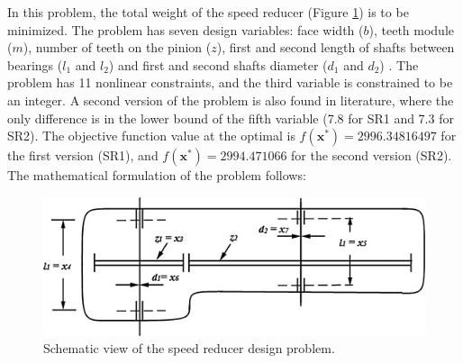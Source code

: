 

In this problem, the total weight of the speed reducer (Figure \ref{fig:SR}) is to be minimized. The problem has seven design variables: face width ($b$), teeth module ($m$), number of teeth on the pinion ($z$), first and second length of shafts between bearings ($l_1$ and $l_2$) and first and second shafts diameter ($d_1$ and $d_2$) \citep{SR}. The problem has 11 nonlinear constraints, and the third variable is constrained to be an integer. A second version of the problem is also found in literature, where the only difference is in the lower bound of the fifth variable (7.8 for SR1 and 7.3 for SR2). The objective function value at the optimal is $f(\bm{x}^*) = 2996.34816497$ for the first version (SR1), and $f(\bm{x}^*) = 2994.471066$ for the second version (SR2). The mathematical formulation of the problem follows:

\vspace{-0.5cm}



\vspace{0.5cm}

\begin{figure}[h]
    \begin{center}
    \includegraphics[scale=0.6]{img/Problems/SR.jpg}
    \end{center}
    \captionsetup{justification=centering}
    \caption{Schematic view of the speed reducer design problem.}\label{fig:SR}
\end{figure}
